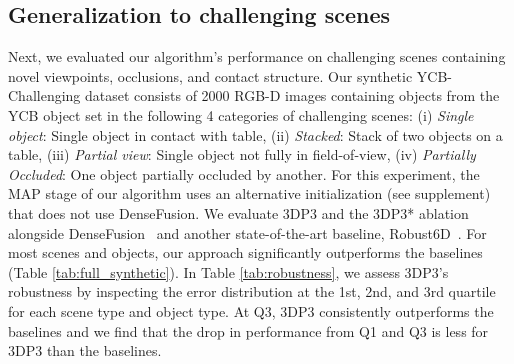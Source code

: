 \subsection{Generalization to challenging scenes}
\vspace{-2mm}Next, we evaluated our algorithm's performance on challenging scenes containing novel viewpoints, occlusions, and contact structure.
Our synthetic YCB-Challenging dataset consists of 2000 RGB-D images containing objects from the YCB object set \cite{calli2015benchmarking} in the following 4 categories of challenging scenes: (i) \textit{Single object}: Single object in contact with table, (ii) \textit{Stacked}: Stack of two objects on a table, (iii) \textit{Partial view}: Single object not fully in field-of-view, (iv) \textit{Partially Occluded}: One object partially occluded by another.
For this experiment, the MAP stage of our algorithm uses an alternative initialization (see supplement) that does not use DenseFusion.
We evaluate 3DP3 and the 3DP3* ablation alongside DenseFusion~\cite{wang2019densefusion} and another state-of-the-art baseline, Robust6D~\cite{tian2020robust}.
For most scenes and
objects, our approach significantly outperforms the baselines
(Table \ref{tab:full_synthetic}).
In Table \ref{tab:robustness}, we assess 3DP3's robustness by inspecting the error distribution at the 1st, 2nd,
and 3rd quartile for each scene type and object type. At Q3, 3DP3 consistently outperforms the baselines and we find that the drop in performance from Q1 and Q3 is less for 3DP3 than the baselines.




